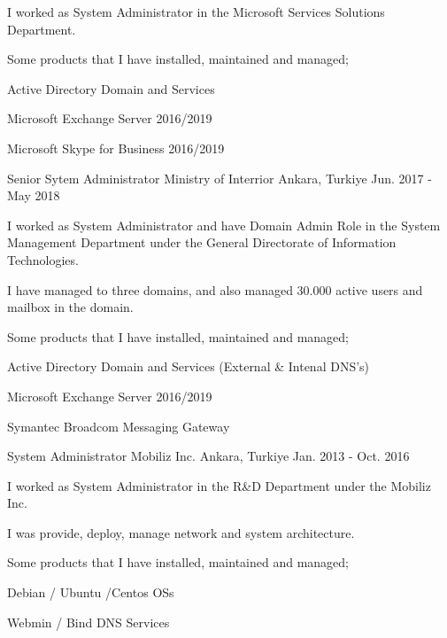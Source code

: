 \begin{cventries}
{\begin{cvitems}
        \item {I worked as System Administrator in the Microsoft Services Solutions Department.}
        \item {Some products that I have installed, maintained and managed;}
        \item {Active Directory Domain and Services}
        \item {Microsoft Exchange Server 2016/2019}
        \item {Microsoft Skype for Business 2016/2019}
      \end{cvitems}
    }
  \cventry
    {Senior Sytem Administrator} %
    {Ministry of Interrior} %
    {Ankara, Turkiye} %
    {Jun. 2017 - May 2018} %
    {
      \begin{cvitems} %
        \item {I worked as System Administrator and have Domain Admin Role in the System Management Department under the General Directorate of Information Technologies.}
        \item {I have managed to three domains, and also managed 30.000 active users and mailbox in the domain.}
        \item {Some products that I have installed, maintained and managed;}
        \item {Active Directory Domain and Services (External \& Intenal DNS's)}
        \item {Microsoft Exchange Server 2016/2019}
        \item {Symantec Broadcom Messaging Gateway}
      \end{cvitems}
    }
  \cventry
    {System Administrator} %
    {Mobiliz Inc.} %
    {Ankara, Turkiye} %
    {Jan. 2013 - Oct. 2016} %
    {
      \begin{cvitems} %
        \item {I worked as System Administrator in the R\&D Department under the Mobiliz Inc.}
        \item {I was provide, deploy, manage network and system architecture.}
        \item {Some products that I have installed, maintained and managed;}
        \item {Debian / Ubuntu /Centos OSs}
        \item {Webmin / Bind DNS Services}

\end{cvitems}}
\end{cventries}
